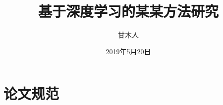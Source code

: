 \documentclass[doctor,pdf]{chinathesis}
\title{基于深度学习的某某方法研究}
\author{甘木人} %
\date{2019年5月20日} %
\begin{document}
\maketitle %
\makestatement %
%

\frontmatter


\tableofcontents
\listoffigures
\listoftables


\mainmatter







\appendix
\chapter{论文规范}

\backmatter


\end{document}
